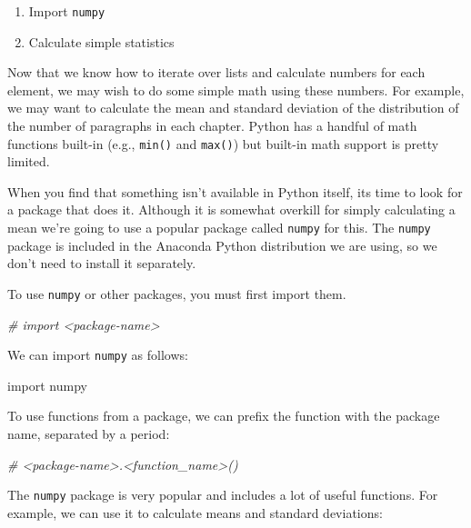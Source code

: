 \documentclass[
]{book}
\newenvironment{Shaded}{\begin{snugshade}}{\end{snugshade}}
\newcommand{\CommentTok}[1]{\textcolor[rgb]{0.56,0.35,0.01}{\textit{#1}}}
\newcommand{\ImportTok}[1]{#1}
\newcommand{\NormalTok}[1]{#1}
\providecommand{\tightlist}{%
  \setlength{\itemsep}{0pt}\setlength{\parskip}{0pt}}
\begin{document}
\begin{enumerate}
\def\labelenumi{\arabic{enumi}.}
\tightlist
\item
  Import \texttt{numpy}
\item
  Calculate simple statistics
\end{enumerate}

Now that we know how to iterate over lists and calculate numbers for each element, we may wish to do some simple math using these numbers. For example, we may want to calculate the mean and standard deviation of the distribution of the number of paragraphs in each chapter. Python has a handful of math functions built-in (e.g., \texttt{min()} and \texttt{max()}) but built-in math support is pretty limited.

When you find that something isn't available in Python itself, its time to look for a package that does it. Although it is somewhat overkill for simply calculating a mean we're going to use a popular package called \texttt{numpy} for this. The \texttt{numpy} package is included in the Anaconda Python distribution we are using, so we don't need to install it separately.

To use \texttt{numpy} or other packages, you must first import them.

\begin{Shaded}
\begin{Highlighting}[]
\CommentTok{# import <package-name>}
\end{Highlighting}
\end{Shaded}

We can import \texttt{numpy} as follows:

\begin{Shaded}
\begin{Highlighting}[]
\ImportTok{import}\NormalTok{ numpy}
\end{Highlighting}
\end{Shaded}

To use functions from a package, we can prefix the function with the package name, separated by a period:

\begin{Shaded}
\begin{Highlighting}[]
\CommentTok{# <package-name>.<function_name>()}
\end{Highlighting}
\end{Shaded}

The \texttt{numpy} package is very popular and includes a lot of useful functions. For example, we can use it to calculate means and standard deviations:
\end{document}
